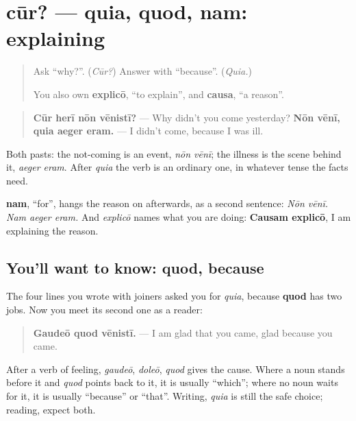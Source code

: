 \section[cūr? — quia …, quod …, nam …]{cūr? — quia, quod, nam: explaining}

\label{lesson:LA-C284-explico}



\begin{quote}
Ask \textquotedblleft{}why?\textquotedblright{}. (\emph{Cūr?}) Answer with \textquotedblleft{}because\textquotedblright{}. (\emph{Quia.})

You also own \textbf{explicō}, \textquotedblleft{}to explain\textquotedblright{}, and \textbf{causa}, \textquotedblleft{}a reason\textquotedblright{}.
\end{quote}

\begin{grammarlens}[title={Grammar Lens: the answer to cūr}]
\begin{quote}
\textbf{Cūr herī nōn vēnistī?} — Why didn't you come yesterday? \textbf{Nōn vēnī, quia aeger eram.} — I didn't come, because I was ill.
\end{quote}

Both pasts: the not-coming is an event, \emph{nōn vēnī}; the illness is the scene behind it, \emph{aeger eram}. After \emph{quia} the verb is an ordinary one, in whatever tense the facts need.

\textbf{nam}, \textquotedblleft{}for\textquotedblright{}, hangs the reason on afterwards, as a second sentence: \emph{Nōn vēnī. Nam aeger eram.} And \emph{explicō} names what you are doing: \textbf{Causam explicō}, I am explaining the reason.
\end{grammarlens}

\subsection*{You'll want to know: quod, because}
The four lines you wrote with joiners asked you for \emph{quia}, because \textbf{quod} has two jobs. Now you meet its second one as a reader:

\begin{quote}
\textbf{Gaudeō quod vēnistī.} — I am glad that you came, glad because you came.
\end{quote}

After a verb of feeling, \emph{gaudeō}, \emph{doleō}, \emph{quod} gives the cause. Where a noun stands before it and \emph{quod} points back to it, it is usually \textquotedblleft{}which\textquotedblright{}; where no noun waits for it, it is usually \textquotedblleft{}because\textquotedblright{} or \textquotedblleft{}that\textquotedblright{}. Writing, \emph{quia} is still the safe choice; reading, expect both.


